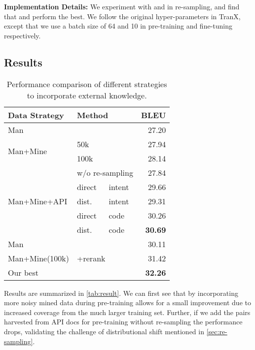 \documentclass[11pt,a4paper]{article}
\begin{document}
\noindent \textbf{Implementation Details:}
We experiment with  and  in re-sampling, and find that  and  perform the best.
We follow the original hyper-parameters in TranX, except that we use a batch size of 64 and 10 in pre-training and fine-tuning respectively.











\subsection{Results}\label{sec:exp_result}



\begin{table}[t]
\begin{center}
\small
\begin{tabular}{lllr}
\toprule
\textbf{Data Strategy} & \multicolumn{2}{l}{\textbf{Method}} & \textbf{BLEU} \\
\midrule
Man & & & 27.20 \\
\midrule
\multirow{2}{*}{Man+Mine}& \multicolumn{2}{l}{50k} & 27.94 \\
& \multicolumn{2}{l}{100k} & 28.14 \\
\midrule
\multirow{5}{*}{Man+Mine+API} & \multicolumn{2}{c}{w/o re-sampling} & 27.84 \\
& direct & intent & 29.66 \\
& dist. & intent & 29.31 \\
& direct & code & 30.26 \\
& dist. & code & \textbf{30.69} \\
\midrule
Man & \multicolumn{2}{l}{\multirow{3}{*}{+rerank}} & 30.11  \\
Man+Mine(100k) & \multicolumn{2}{c}{} & 31.42 \\
Our best & \multicolumn{2}{c}{} & \textbf{32.26} \\
\bottomrule
\end{tabular}
\end{center}
\vspace{-2.5mm}
\caption{Performance comparison of different strategies to incorporate external knowledge.}
\vspace{-3mm}
\label{tab:result}
\end{table}

Results are summarized in \autoref{tab:result}.
We can first see that by incorporating more noisy mined data during pre-training allows for a small improvement due to increased coverage from the much larger training set.
Further, if we add the pairs harvested from API docs for pre-training without re-sampling the performance drops, validating the challenge of distributional shift mentioned in \autoref{sec:re-sampling}.
\end{document}
